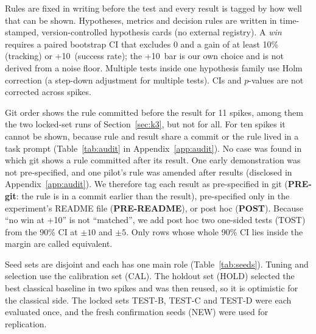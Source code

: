 Rules are fixed in writing before the test and every result is tagged by how well that can be shown. Hypotheses, metrics and decision rules are written in time-stamped, version-controlled hypothesis cards (no external registry). A \emph{win} requires a paired bootstrap CI that excludes 0 and a gain of at least 10\% (tracking) or +10\pp\ (success rate); the +10\pp\ bar is our own choice and is not derived from a noise floor. Multiple tests inside one hypothesis family use Holm correction (a step-down adjustment for multiple tests). CIs and $p$-values are not corrected across spikes.

Git order shows the rule committed before the result for 11 spikes, among them the two locked-set runs of Section~\ref{sec:k3}, but not for all. For ten spikes it cannot be shown, because rule and result share a commit or the rule lived in a task prompt (Table~\ref{tab:audit} in Appendix~\ref{app:audit}). No case was found in which git shows a rule committed after its result. One early demonstration was not pre-specified, and one pilot's rule was amended after results (disclosed in Appendix~\ref{app:audit}). We therefore tag each result as pre-specified in git (\textbf{PRE-git}: the rule is in a commit earlier than the result), pre-specified only in the experiment's README file (\textbf{PRE-README}), or post hoc (\textbf{POST}). Because ``no win at +10\pp'' is not ``matched'', we add post hoc two one-sided tests (TOST) from the 90\% CI at $\pm10$ and $\pm5$\pp. Only rows whose whole 90\% CI lies inside the margin are called equivalent.

Seed sets are disjoint and each has one main role (Table~\ref{tab:seeds}). Tuning and selection use the calibration set (CAL). The holdout set (HOLD) selected the best classical baseline in two spikes and was then reused, so it is optimistic for the classical side. The locked sets TEST-B, TEST-C and TEST-D were each evaluated once, and the fresh confirmation seeds (NEW) were used for replication.

